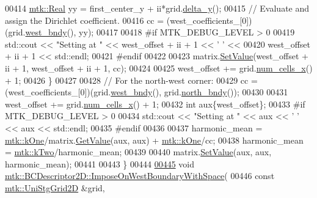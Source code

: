 \begin{DoxyCode}
00414     \hyperlink{group__c01-roots_gac080bbbf5cbb5502c9f00405f894857d}{mtk::Real} yy = first\_center\_y + ii*grid.\hyperlink{classmtk_1_1UniStgGrid2D_a65a78cfc80ffdbeb282ed57af4dc5cb4}{delta\_y}();
00415     \textcolor{comment}{// Evaluate and assign the Dirichlet coefficient.}
00416     cc = (west\_coefficients\_[0])(grid.\hyperlink{classmtk_1_1UniStgGrid2D_af2b1712387ded85edaf2b64617d3fc13}{west\_bndy}(), yy);
00417 
00418 \textcolor{preprocessor}{    #if MTK\_DEBUG\_LEVEL > 0}
00419     std::cout << \textcolor{stringliteral}{"Setting at "} << west\_offset + ii + 1 << \textcolor{charliteral}{' '} <<
00420       west\_offset + ii + 1 << std::endl;
00421 \textcolor{preprocessor}{    #endif}
00422 
00423     matrix.\hyperlink{classmtk_1_1DenseMatrix_a784ce5784109ac86bfb9d8562b334b13}{SetValue}(west\_offset + ii + 1, west\_offset + ii + 1, cc);
00424 
00425     west\_offset += grid.\hyperlink{classmtk_1_1UniStgGrid2D_a2d182866a398aba8e4829590e85bf939}{num\_cells\_x}() + 1;
00426   \}
00427 
00428   \textcolor{comment}{// For the north-west corner:}
00429   cc = (west\_coefficients\_[0])(grid.\hyperlink{classmtk_1_1UniStgGrid2D_af2b1712387ded85edaf2b64617d3fc13}{west\_bndy}(), grid.\hyperlink{classmtk_1_1UniStgGrid2D_afe1ead253cdeb5503e0489eba8fd84e2}{north\_bndy}());
00430 
00431   west\_offset += grid.\hyperlink{classmtk_1_1UniStgGrid2D_a2d182866a398aba8e4829590e85bf939}{num\_cells\_x}() + 1;
00432   \textcolor{keywordtype}{int} aux\{west\_offset\};
00433 \textcolor{preprocessor}{  #if MTK\_DEBUG\_LEVEL > 0}
00434   std::cout << \textcolor{stringliteral}{"Setting at "} << aux << \textcolor{charliteral}{' '} << aux << std::endl;
00435 \textcolor{preprocessor}{  #endif}
00436 
00437   harmonic\_mean = \hyperlink{group__c01-roots_ga26407c24d43b6b95480943340d285c71}{mtk::kOne}/matrix.\hyperlink{classmtk_1_1DenseMatrix_a4b23ecbebd970b5eea915dbb50691024}{GetValue}(aux, aux) + 
      \hyperlink{group__c01-roots_ga26407c24d43b6b95480943340d285c71}{mtk::kOne}/cc;
00438   harmonic\_mean = \hyperlink{group__c01-roots_gaf39c2d851a2db744f4feb1c5ab3ec2cf}{mtk::kTwo}/harmonic\_mean;
00439 
00440   matrix.\hyperlink{classmtk_1_1DenseMatrix_a784ce5784109ac86bfb9d8562b334b13}{SetValue}(aux, aux, harmonic\_mean);
00441 
00443 \}
00444 
\hypertarget{mtk__bc__descriptor__2d_8cc_source_l00445}{}\hyperlink{classmtk_1_1BCDescriptor2D_aa5d88027ff9c5d2eccab93cd51154c9e}{00445} \textcolor{keywordtype}{void} \hyperlink{classmtk_1_1BCDescriptor2D_aa5d88027ff9c5d2eccab93cd51154c9e}{mtk::BCDescriptor2D::ImposeOnWestBoundaryWithSpace}(
00446     \textcolor{keyword}{const} \hyperlink{classmtk_1_1UniStgGrid2D}{mtk::UniStgGrid2D} &grid,

\end{DoxyCode}
